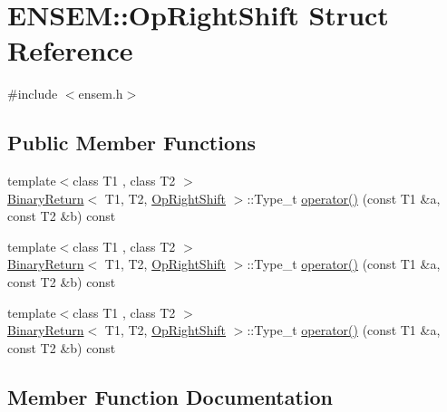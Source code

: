 \hypertarget{structENSEM_1_1OpRightShift}{}\section{E\+N\+S\+EM\+:\+:Op\+Right\+Shift Struct Reference}
\label{structENSEM_1_1OpRightShift}


{\ttfamily \#include $<$ensem.\+h$>$}

\subsection*{Public Member Functions}
\begin{DoxyCompactItemize}
\item 
{\footnotesize template$<$class T1 , class T2 $>$ }\\\mbox{\hyperlink{structENSEM_1_1BinaryReturn}{Binary\+Return}}$<$ T1, T2, \mbox{\hyperlink{structENSEM_1_1OpRightShift}{Op\+Right\+Shift}} $>$\+::Type\+\_\+t \mbox{\hyperlink{structENSEM_1_1OpRightShift_a8cfd6827272b2d7eda3b0912d67e4967}{operator()}} (const T1 \&a, const T2 \&b) const
\item 
{\footnotesize template$<$class T1 , class T2 $>$ }\\\mbox{\hyperlink{structENSEM_1_1BinaryReturn}{Binary\+Return}}$<$ T1, T2, \mbox{\hyperlink{structENSEM_1_1OpRightShift}{Op\+Right\+Shift}} $>$\+::Type\+\_\+t \mbox{\hyperlink{structENSEM_1_1OpRightShift_a8cfd6827272b2d7eda3b0912d67e4967}{operator()}} (const T1 \&a, const T2 \&b) const
\item 
{\footnotesize template$<$class T1 , class T2 $>$ }\\\mbox{\hyperlink{structENSEM_1_1BinaryReturn}{Binary\+Return}}$<$ T1, T2, \mbox{\hyperlink{structENSEM_1_1OpRightShift}{Op\+Right\+Shift}} $>$\+::Type\+\_\+t \mbox{\hyperlink{structENSEM_1_1OpRightShift_a8cfd6827272b2d7eda3b0912d67e4967}{operator()}} (const T1 \&a, const T2 \&b) const
\end{DoxyCompactItemize}


\subsection{Member Function Documentation}
\mbox{\label{structENSEM_1_1OpRightShift_a8cfd6827272b2d7eda3b0912d67e4967}} 
